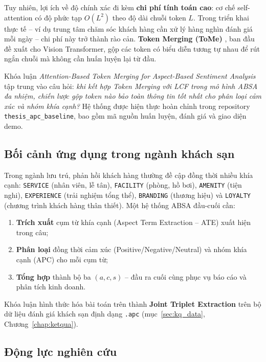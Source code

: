 Tuy nhiên, lợi ích về độ chính xác đi kèm \textbf{chi phí tính toán cao}: cơ chế
self-attention có độ phức tạp $O(L^2)$ theo độ dài chuỗi token $L$. Trong triển khai
thực tế -- ví dụ trung tâm chăm sóc khách hàng cần xử lý hàng nghìn đánh giá mỗi ngày
-- chi phí này trở thành rào cản. \textbf{Token Merging (ToMe)} \cite{bolya2023tome},
ban đầu đề xuất cho Vision Transformer, gộp các token có biểu diễn tương tự nhau để
rút ngắn chuỗi mà không cần huấn luyện lại từ đầu.

Khóa luận \textit{Attention-Based Token Merging for Aspect-Based Sentiment Analysis} tập
trung vào câu hỏi: \emph{khi kết hợp Token Merging với LCF trong mô hình ABSA đa nhiệm,
chiến lược gộp token nào bảo toàn thông tin tốt nhất cho phân loại cảm xúc và nhóm khía
cạnh?} Hệ thống được hiện thực hoàn chỉnh trong repository \texttt{thesis\_apc\_baseline},
bao gồm mã nguồn huấn luyện, đánh giá và giao diện demo.

\subsection{Bối cảnh ứng dụng trong ngành khách sạn}

Trong ngành lưu trú, phản hồi khách hàng thường đề cập đồng thời nhiều khía cạnh:
\texttt{SERVICE} (nhân viên, lễ tân), \texttt{FACILITY} (phòng, hồ bơi), \texttt{AMENITY}
(tiện nghi), \texttt{EXPERIENCE} (trải nghiệm tổng thể), \texttt{BRANDING} (thương hiệu)
và \texttt{LOYALTY} (chương trình khách hàng thân thiết). Một hệ thống ABSA đầu-cuối cần:

\begin{enumerate}
  \item \textbf{Trích xuất} cụm từ khía cạnh (Aspect Term Extraction -- ATE) xuất hiện
        trong câu;
  \item \textbf{Phân loại} đồng thời cảm xúc (Positive/Negative/Neutral) và nhóm khía
        cạnh (APC) cho mỗi cụm từ;
  \item \textbf{Tổng hợp} thành bộ ba \((a, c, s)\) -- đầu ra cuối cùng phục vụ báo cáo
        và phân tích kinh doanh.
\end{enumerate}

Khóa luận hình thức hóa bài toán trên thành \textbf{Joint Triplet Extraction} trên bộ
dữ liệu đánh giá khách sạn định dạng \texttt{.apc} (mục~\ref{sec:kq_data},
Chương~\ref{chap:ketqua}).

\subsection{Động lực nghiên cứu}


